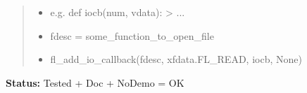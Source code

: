 \begin{boxedminipage}{\funcwidth}
\begin{quote}
\begin{itemize}
  \item
    \setlength{\parskip}{0.6ex}

e.g. def iocb(num, vdata): > ...


  \item 
fdesc = some\_function\_to\_open\_file


  \item 
fl\_add\_io\_callback(fdesc, xfdata.FL\_READ, iocb, None)


\end{itemize}

\end{quote}

\textbf{Status:} 
Tested + Doc + NoDemo = OK


    \end{boxedminipage}

    \label{xformslib:flbasic:fl_remove_io_callback}

    \vspace{0.5ex}

